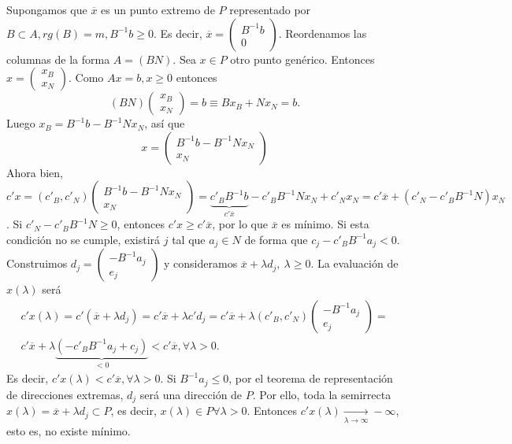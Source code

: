 \documentclass[PM.tex]{subfiles}
\begin{document}
Supongamos que $\overline{x}$ es un punto extremo de $P$ representado por $B\subset A, rg(B)=m, B^{-1}b\geq 0$. Es decir, $\overline{x}=\begin{pmatrix}
B^{-1}b\\
0
\end{pmatrix}$. Reordenamos las columnas de la forma $A=(B N)$. Sea $x\in P$ otro punto genérico. Entonces $x=\begin{pmatrix}
x_B\\
x_N
\end{pmatrix}$. Como $Ax=b, x\geq 0$ entonces
\[ (B N) \begin{pmatrix}
x_B\\
x_N
\end{pmatrix}= b\equiv Bx_B + Nx_N=b.\]
Luego $x_B=B^{-1}b-B^{-1}Nx_N$, así que 
\[ x=\begin{pmatrix}
B^{-1}b-B^{-1}Nx_N\\
x_N
\end{pmatrix}\]
Ahora bien, \[c'x=(c'_B, c'_N)\begin{pmatrix}
B^{-1}b-B^{-1}Nx_N\\
x_N
\end{pmatrix}=\underbrace{c'_B B^{-1}b}_{c'\overline{x}}-c'_B B^{-1}Nx_N+c'_Nx_N=c'\overline{x}+(c'_N-c'_BB^{-1}N)x_N\]. Si $c'_N-c'_BB^{-1}N\geq 0$, entonces $c'x\geq c'\overline{x}$, por lo que $\overline{x}$ es mínimo. Si esta condición no se cumple, existirá $j$ tal que $a_j\in N$ de forma que $c_j-c'_BB^{-1}a_j<0$. Construimos $d_j=\begin{pmatrix}
-B^{-1}a_j\\
e_j
\end{pmatrix}$ y consideramos $\overline{x}+\lambda d_j,\ \lambda\geq 0$. La evaluación de $x(\lambda)$ será 
\begin{gather*}
c'x(\lambda)=c'(\overline{x}+\lambda d_j)=c'\overline{x}+\lambda c'd_j=c'\overline{x}+\lambda(c'_B, c'_N)\begin{pmatrix}
-B^{-1}a_j\\
e_j
\end{pmatrix}=\\
c'\overline{x}+\lambda\underbrace{(-c'_B B^{-1}a_j +c_j)}_{<0}< c'\overline{x}, \forall\lambda >0.
\end{gather*}
Es decir, $c'x(\lambda)<c'\overline{x}, \forall\lambda >0$. Si $B^{-1}a_j\leq 0$, por el teorema de representación de direcciones extremas, $d_j$ será una dirección de $P$. Por ello, toda la semirrecta $x(\lambda)=\overline{x}+\lambda d_j\subset P$, es decir, $x(\lambda)\in P\forall\lambda >0$. Entonces $c'x(\lambda)\underset{\lambda\to\infty}{\longrightarrow} -\infty$, esto es, no existe mínimo.
\end{document}
